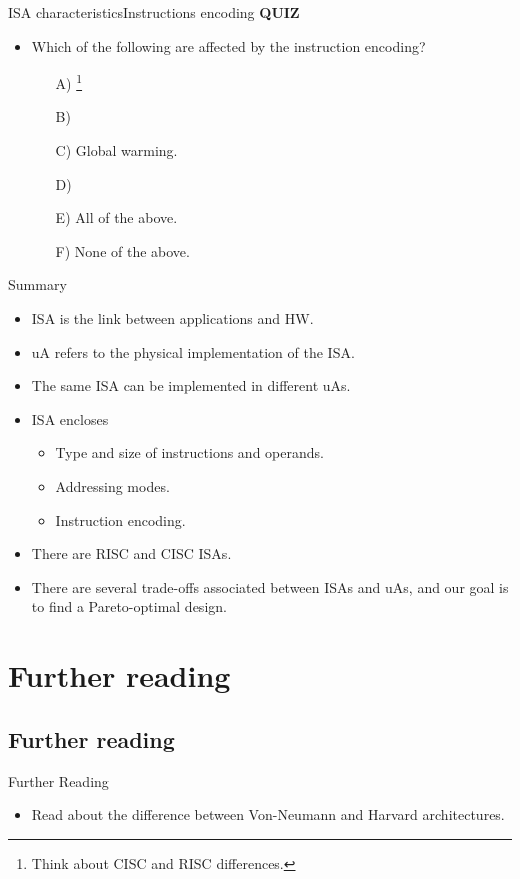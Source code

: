 \begin{frame}{\acs{ISA} characteristics}{Instructions encoding}
  \textbf{\large{QUIZ}} \\
  \begin{itemize}
    \item Which of the following are affected by the instruction encoding?
    \begin{enumerate}
      \item[A)] \footnote{Think about \ac{CISC} and \ac{RISC} differences.}
      \item[B)] 
      \item[C)] Global warming.
      \item[D)] 
      \item[E)] All of the above.
      \item[F)] None of the above.
    \end{enumerate}   
  \end{itemize}
\end{frame}

\begin{frame}{Summary}
  \begin{itemize}
  \item \ac{ISA} is the link between applications and \ac{HW}.
  \item \ac{uA} refers to the physical implementation of the \ac{ISA}.
  \item The same \ac{ISA} can be implemented in different \acp{uA}.
   \item \ac{ISA} encloses
  \begin{itemize}
  \item Type and size of instructions and operands.
  \item Addressing modes.
  \item Instruction encoding.
  \end{itemize}
  \item There are \ac{RISC} and \ac{CISC} \acp{ISA}.
  \item There are several trade-offs associated between \acp{ISA} and \acp{uA}, and our goal is to find a Pareto-optimal design.
  \end{itemize}
\end{frame}

\section*{Further reading}
\subsection*{Further reading}
\begin{frame}{Further Reading}
\begin{itemize}
  \item Read about the difference between Von-Neumann and Harvard architectures. 
\end{itemize} 
\end{frame}

%
